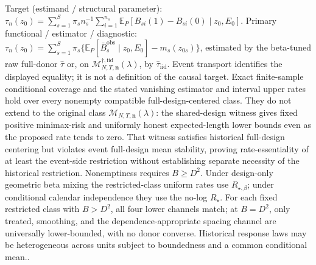\documentclass{article}
\begin{document}
Target (estimand / structural parameter): \(\tau_n(z_0)=\sum_{s=1}^{S}\pi_s n_s^{-1}\sum_{i=1}^{n_s}\mathbb E_P[B_{si}(1)-B_{si}(0)\mid z_0,E_0]\).
Primary functional / estimator / diagnostic: \(\tau_n(z_0)=\sum_{s=1}^{S}\pi_s\{\mathbb E_P[\bar B_s^{\mathrm{obs}}\mid z_0,E_0]-m_s(z_{0s})\}\), estimated by the beta-tuned raw full-donor \(\widehat\tau\) or, on \(\mathcal M_{N,T,\mathbf n}^{\dagger,\mathrm{iid}}(\lambda)\), by \(\widehat\tau_{\mathrm{iid}}\).  Event transport identifies the displayed equality; it is not a definition of the causal target.  Exact finite-sample conditional coverage and the stated vanishing estimator and interval upper rates hold over every nonempty compatible full-design-centered class.  They do not extend to the original class \(\mathcal M_{N,T,\mathbf n}(\lambda)\): the shared-design witness gives fixed positive minimax-risk and uniformly honest expected-length lower bounds even as the proposed rate tends to zero.  That witness satisfies historical full-design centering but violates event full-design mean stability, proving rate-essentiality of at least the event-side restriction without establishing separate necessity of the historical restriction.  Nonemptiness requires \(B\ge D^2\).  Under design-only geometric beta mixing the restricted-class uniform rates use \(R_{\star,\beta}\); under conditional calendar independence they use the no-log \(R_\star\).  For each fixed restricted class with \(B>D^2\), all four lower channels match; at \(B=D^2\), only treated, smoothing, and the dependence-appropriate spacing channel are universally lower-bounded, with no donor converse.  Historical response laws may be heterogeneous across units subject to boundedness and a common conditional mean..
\end{document}
